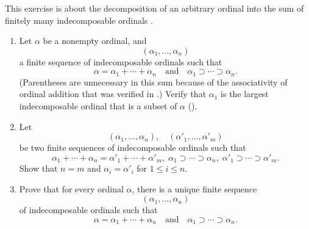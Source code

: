 \documentclass{article}
\begin{document}
\begin{exercise}
  \label{exe:fdb94svq}
  This exercise is about the decomposition of an arbitrary ordinal
  into the sum of finitely many indecomposable ordinals
  \parencite[Chapter~XVI, Section~6, Theorem~2]{bib:embpmrus}.
  \begin{enumerate}
  \item Let \(\alpha\) be a nonempty ordinal, and
    \begin{displaymath}
      (\alpha_1, \dotsc, \alpha_n)
    \end{displaymath}
    a finite sequence of indecomposable ordinals such that
    \begin{displaymath}
      \alpha = \alpha_1 + \dotsb + \alpha_n
      \quad \text{and} \quad
      \alpha_1 \supset \dotsb \supset \alpha_n.
    \end{displaymath}
    (Parentheses are unnecessary in this sum because of the
    associativity of ordinal addition that was verified in
    .)  Verify that \(\alpha_1\) is the largest
    indecomposable ordinal that is a subset of \(\alpha\)
    ().
  \item Let
    \begin{displaymath}
      (\alpha_1, \dotsc, \alpha_n),
      \quad
      (\alpha'_1, \dotsc, \alpha'_m)
    \end{displaymath}
    be two finite sequences of indecomposable ordinals such that
    \begin{displaymath}
      \alpha_1 + \dotsb + \alpha_n = \alpha'_1 + \dotsb + \alpha'_m,
      \;
      \alpha_1 \supset \dotsb \supset \alpha_n,
      \;
      \alpha'_1 \supset \dotsb \supset \alpha'_m.
    \end{displaymath}
    Show that \(n = m\) and \(\alpha_i = \alpha'_i\) for
    \(1 \leq i \leq n\).
  \item Prove that for every ordinal \(\alpha\), there is a unique
    finite sequence
    \begin{displaymath}
      (\alpha_1, \dotsc, \alpha_n)
    \end{displaymath}
    of indecomposable ordinals such that
    \begin{displaymath}
      \alpha = \alpha_1 + \dotsb + \alpha_n
      \quad \text{and} \quad
      \alpha_1 \supset \dotsb \supset \alpha_n.
    \end{displaymath}
  \end{enumerate}
\end{exercise}
\end{document}
